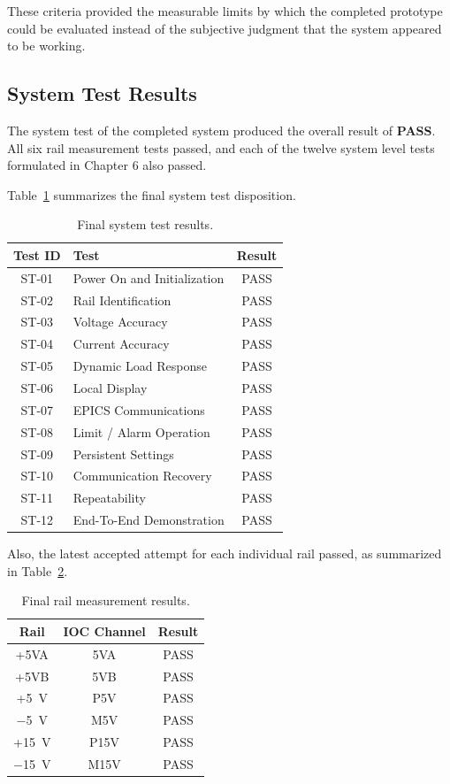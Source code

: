 These criteria provided the measurable limits by which the completed prototype could be evaluated instead of the subjective judgment that the system appeared to be working.

\subsection{System Test Results}

The system test of the completed system produced the overall result of \textbf{PASS}. All six rail measurement tests passed, and each of the twelve system level tests formulated in Chapter 6 also passed.

Table~\ref{tab:system-test-results} summarizes the final system test disposition.

\begin{table}[htbp]
	\centering
	\caption{Final system test results.}
	\label{tab:system-test-results}
	\begin{tabular}{clc}
		\hline
		\textbf{Test ID} & \textbf{Test} & \textbf{Result} \\
		\hline
		ST-01 & Power On and Initialization & PASS \\
		ST-02 & Rail Identification & PASS \\
		ST-03 & Voltage Accuracy & PASS \\
		ST-04 & Current Accuracy & PASS \\
		ST-05 & Dynamic Load Response & PASS \\
		ST-06 & Local Display & PASS \\
		ST-07 & EPICS Communications & PASS \\
		ST-08 & Limit / Alarm Operation & PASS \\
		ST-09 & Persistent Settings & PASS \\
		ST-10 & Communication Recovery & PASS \\
		ST-11 & Repeatability & PASS \\
		ST-12 & End-To-End Demonstration & PASS \\
		\hline
	\end{tabular}
\end{table}

Also, the latest accepted attempt for each individual rail passed, as summarized in Table~\ref{tab:rail-results}.

\begin{table}[htbp]
	\centering
	\caption{Final rail measurement results.}
	\label{tab:rail-results}
	\begin{tabular}{ccc}
		\hline
		\textbf{Rail} & \textbf{IOC Channel} & \textbf{Result} \\
		\hline
		+5VA  & 5VA  & PASS \\
		+5VB  & 5VB  & PASS \\
		+5~V  & P5V  & PASS \\
		$-$5~V  & M5V  & PASS \\
		+15~V & P15V & PASS \\
		$-$15~V & M15V & PASS \\
		\hline
	\end{tabular}
\end{table}

